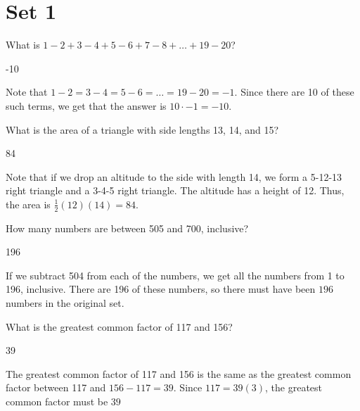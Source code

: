 \documentclass[11pt]{article}
\begin{document}
\section*{Set 1}
\begin{problem}
What is $1-2+3-4+5-6+7-8 + \dots + 19-20$?
\end{problem}

\begin{answer}
-10
\end{answer}

\begin{solution}
Note that $1-2=3-4=5-6=\dots=19-20=-1$. Since there are 10 of these such terms, we get that the answer is $10\cdot -1 = \boxed{-10}$.
\end{solution}

\begin{problem}
What is the area of a triangle with side lengths 13, 14, and 15?
\end{problem}

\begin{answer}
84
\end{answer}

\begin{solution}
Note that if we drop an altitude to the side with length 14, we form a 5-12-13 right triangle and a 3-4-5 right triangle. The altitude has a height of 12. Thus, the area is $\frac{1}{2}(12)(14) = \boxed{84}$.
\end{solution}

\begin{problem}
How many numbers are between 505 and 700, inclusive?
\end{problem}

\begin{answer}
196
\end{answer}

\begin{solution}
If we subtract 504 from each of the numbers, we get all the numbers from 1 to 196, inclusive. There are 196 of these numbers, so there must have been $\boxed{196}$ numbers in the original set.
\end{solution}

\begin{problem}
What is the greatest common factor of 117 and 156?
\end{problem}

\begin{answer}
39
\end{answer}

\begin{solution}
The greatest common factor of 117 and 156 is the same as the greatest common factor between 117 and $156-117=39$. Since $117=39(3)$, the greatest common factor must be $\boxed{39}$
\end{solution}
\newpage
\end{document}
